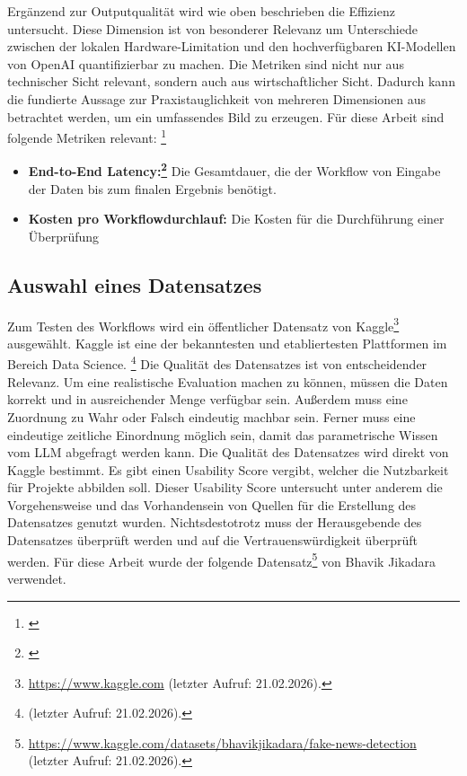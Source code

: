 \documentclass[12pt,a4paper]{article}
\begin{document}
    Ergänzend zur Outputqualität wird wie oben beschrieben die Effizienz untersucht. Diese Dimension ist von besonderer
    Relevanz um Unterschiede zwischen der lokalen Hardware-Limitation und den hochverfügbaren KI-Modellen von OpenAI
    quantifizierbar zu machen. Die Metriken sind nicht nur aus technischer Sicht relevant, sondern auch
    aus wirtschaftlicher Sicht. Dadurch kann die fundierte Aussage zur Praxistauglichkeit von mehreren Dimensionen aus
    betrachtet werden, um ein umfassendes Bild zu erzeugen. Für diese Arbeit sind folgende Metriken relevant: \footnote{\cite[S. 6.]{AigenticAiOptimizing}}

    \begin{itemize}
        \item \textbf{End-to-End Latency:\footnote{\cite[S. 2.]{End2EndLatency}}}
        Die Gesamtdauer, die der Workflow von Eingabe der Daten bis zum finalen Ergebnis benötigt.
        \item \textbf{Kosten pro Workflowdurchlauf:}
        Die Kosten für die Durchführung einer Überprüfung
    \end{itemize}

    \subsection{Auswahl eines Datensatzes}
    Zum Testen des Workflows wird ein öffentlicher Datensatz von Kaggle\footnote{\url{https://www.kaggle.com} (letzter Aufruf: 21.02.2026).} ausgewählt.
    Kaggle ist eine der bekanntesten und etabliertesten Plattformen im Bereich Data Science. \footnote{\cite{KaggleUseCase} (letzter Aufruf: 21.02.2026).}
    Die Qualität des Datensatzes ist von entscheidender Relevanz. Um eine realistische Evaluation machen zu können, müssen
    die Daten korrekt und in ausreichender Menge verfügbar sein. Außerdem muss eine Zuordnung zu Wahr oder Falsch eindeutig machbar sein.
    Ferner muss eine eindeutige zeitliche Einordnung möglich sein, damit das parametrische Wissen vom LLM abgefragt werden kann.
    Die Qualität des Datensatzes wird direkt von Kaggle bestimmt. Es gibt einen Usability Score vergibt, welcher die Nutzbarkeit für
    Projekte abbilden soll. Dieser Usability Score untersucht unter anderem die Vorgehensweise und das Vorhandensein von Quellen für die Erstellung des Datensatzes genutzt wurden.
    Nichtsdestotrotz muss der Herausgebende des Datensatzes überprüft werden und auf die Vertrauenswürdigkeit überprüft werden.
    \newline
    Für diese Arbeit wurde der folgende Datensatz\footnote{\url{https://www.kaggle.com/datasets/bhavikjikadara/fake-news-detection} (letzter Aufruf: 21.02.2026).} von Bhavik Jikadara verwendet.
\end{document}
